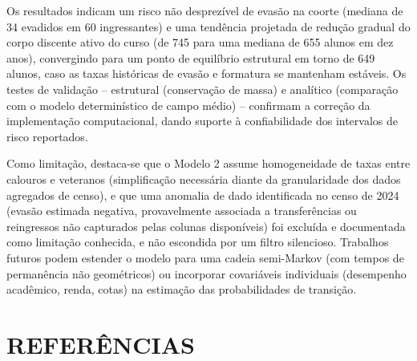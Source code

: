 \documentclass[12pt,times,article,chapter=TITLE]{abnt}
\begin{document}
Os resultados indicam um risco não desprezível de evasão na coorte (mediana de 34 evadidos em 60 ingressantes) e uma tendência projetada de redução gradual do corpo discente ativo do curso (de 745 para uma mediana de 655 alunos em dez anos), convergindo para um ponto de equilíbrio estrutural em torno de 649 alunos, caso as taxas históricas de evasão e formatura se mantenham estáveis. Os testes de validação -- estrutural (conservação de massa) e analítico (comparação com o modelo determinístico de campo médio) -- confirmam a correção da implementação computacional, dando suporte à confiabilidade dos intervalos de risco reportados.

Como limitação, destaca-se que o Modelo 2 assume homogeneidade de taxas entre calouros e veteranos (simplificação necessária diante da granularidade dos dados agregados de censo), e que uma anomalia de dado identificada no censo de 2024 (evasão estimada negativa, provavelmente associada a transferências ou reingressos não capturados pelas colunas disponíveis) foi excluída e documentada como limitação conhecida, e não escondida por um filtro silencioso. Trabalhos futuros podem estender o modelo para uma cadeia semi-Markov (com tempos de permanência não geométricos) ou incorporar covariáveis individuais (desempenho acadêmico, renda, cotas) na estimação das probabilidades de transição.



\chapter*{REFERÊNCIAS}
\end{document}
